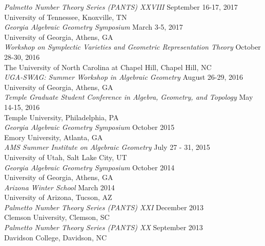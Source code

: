 \documentclass{article}
\begin{document}
  \noindent\textsl{Palmetto Number Theory Series (PANTS) XXVIII} \hfill September 16-17, 2017\\
  University of Tennessee, Knoxville, TN\\
  
  \noindent\textsl{Georgia Algebraic Geometry Symposium} \hfill March 3-5, 2017\\
  University of Georgia, Athens, GA\\

  \noindent\textsl{Workshop on Symplectic Varieties and Geometric Representation Theory} \hfill October 28-30, 2016\\
  The University of North Carolina at Chapel Hill, Chapel Hill, NC\\
  
  \noindent\textsl{UGA-SWAG: Summer Workshop in Algebraic Geometry} \hfill August 26-29, 2016\\
  University of Georgia, Athens, GA\\
  
  \noindent\textsl{Temple Graduate Student Conference in Algebra, Geometry, and Topology} \hfill May 14-15, 2016\\
  Temple University, Philadelphia, PA\\
  
  \noindent\textsl{Georgia Algebraic Geometry Symposium} \hfill October 2015\\
  Emory University, Atlanta, GA\\

  \noindent\textsl{AMS Summer Institute on Algebraic Geometry} \hfill July 27 - 31, 2015\\
  University of Utah, Salt Lake City, UT\\

  \noindent\textsl{Georgia Algebraic Geometry Symposium} \hfill October 2014\\
  University of Georgia, Athens, GA\\

  \noindent\textsl{Arizona Winter School} \hfill March 2014\\
  University of Arizona, Tucson, AZ\\

  \noindent\textsl{Palmetto Number Theory Series (PANTS) XXI} \hfill December 2013\\
  Clemson University, Clemson, SC\\

  \noindent\textsl{Palmetto Number Theory Series (PANTS) XX} \hfill September 2013\\
  Davidson College, Davidson, NC\\
  
\end{document}
